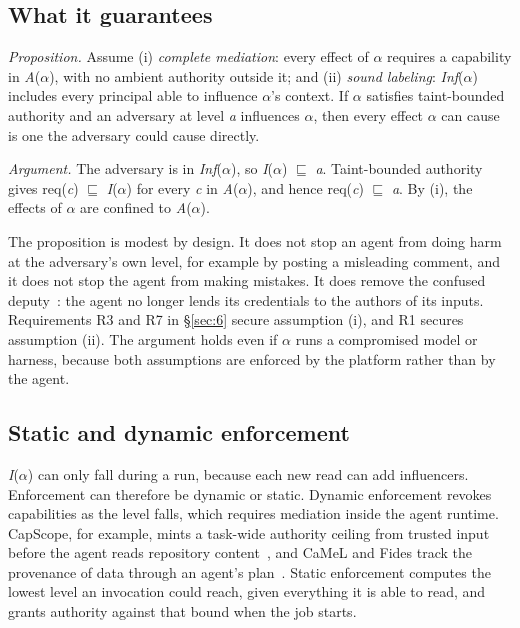 \documentclass[acmsmall,screen,review]{acmart}
\begin{document}
\subsection{What it guarantees}\label{sec:5.3}

\emph{Proposition.} Assume (i) \emph{complete mediation}: every effect of $\alpha$ requires a capability in \emph{A}($\alpha$), with no ambient authority outside it; and (ii) \emph{sound labeling}: \emph{Inf}($\alpha$) includes every principal able to influence $\alpha$'s context. If $\alpha$ satisfies taint-bounded authority and an adversary at level \emph{a} influences $\alpha$, then every effect $\alpha$ can cause is one the adversary could cause directly.

\emph{Argument.} The adversary is in \emph{Inf}($\alpha$), so \emph{I}($\alpha$) $\sqsubseteq$ \emph{a}. Taint-bounded authority gives req(\emph{c}) $\sqsubseteq$ \emph{I}($\alpha$) for every \emph{c} in \emph{A}($\alpha$), and hence req(\emph{c}) $\sqsubseteq$ \emph{a}. By (i), the effects of $\alpha$ are confined to \emph{A}($\alpha$). \qedsymbol{}

The proposition is modest by design. It does not stop an agent from doing harm at the adversary's own level, for example by posting a misleading comment, and it does not stop the agent from making mistakes. It does remove the confused deputy~\cite{hardy1988confused}: the agent no longer lends its credentials to the authors of its inputs. Requirements R3 and R7 in \S\ref{sec:6} secure assumption (i), and R1 secures assumption (ii). The argument holds even if $\alpha$ runs a compromised model or harness, because both assumptions are enforced by the platform rather than by the agent.


\subsection{Static and dynamic enforcement}\label{sec:5.4}

\emph{I}($\alpha$) can only fall during a run, because each new read can add influencers. Enforcement can therefore be dynamic or static. Dynamic enforcement revokes capabilities as the level falls, which requires mediation inside the agent runtime. CapScope, for example, mints a task-wide authority ceiling from trusted input before the agent reads repository content~\cite{bouras2026authority}, and CaMeL and Fides track the provenance of data through an agent's plan~\cite{debenedetti2025defeating,costa2025securing}. Static enforcement computes the lowest level an invocation could reach, given everything it is able to read, and grants authority against that bound when the job starts.
\end{document}

